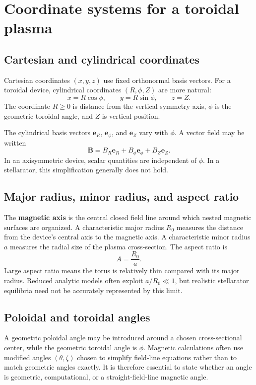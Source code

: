 \section{Coordinate systems for a toroidal plasma}
\label{sec:coordinates}

\subsection{Cartesian and cylindrical coordinates}
Cartesian coordinates $(x,y,z)$ use fixed orthonormal basis vectors. For a toroidal device, cylindrical coordinates $(R,\phi,Z)$ are more natural:
\begin{equation}
x=R\cos\phi,
\qquad
y=R\sin\phi,
\qquad z=Z.
\end{equation}
The coordinate $R\geq 0$ is distance from the vertical symmetry axis, $\phi$ is the geometric toroidal angle, and $Z$ is vertical position.

The cylindrical basis vectors $\mathbf e_R$, $\mathbf e_\phi$, and $\mathbf e_Z$ vary with $\phi$. A vector field may be written
\begin{equation}
\mathbf B=B_R\mathbf e_R+B_\phi\mathbf e_\phi+B_Z\mathbf e_Z.
\end{equation}
In an axisymmetric device, scalar quantities are independent of $\phi$. In a stellarator, this simplification generally does not hold.

\subsection{Major radius, minor radius, and aspect ratio}
The \textbf{magnetic axis} is the central closed field line around which nested magnetic surfaces are organized. A characteristic major radius $R_0$ measures the distance from the device's central axis to the magnetic axis. A characteristic minor radius $a$ measures the radial size of the plasma cross-section. The aspect ratio is
\begin{equation}
A=\frac{R_0}{a}.
\end{equation}
Large aspect ratio means the torus is relatively thin compared with its major radius. Reduced analytic models often exploit $a/R_0\ll1$, but realistic stellarator equilibria need not be accurately represented by this limit.

\subsection{Poloidal and toroidal angles}
A geometric poloidal angle may be introduced around a chosen cross-sectional center, while the geometric toroidal angle is $\phi$. Magnetic calculations often use modified angles $(\theta,\zeta)$ chosen to simplify field-line equations rather than to match geometric angles exactly. It is therefore essential to state whether an angle is geometric, computational, or a straight-field-line magnetic angle.

